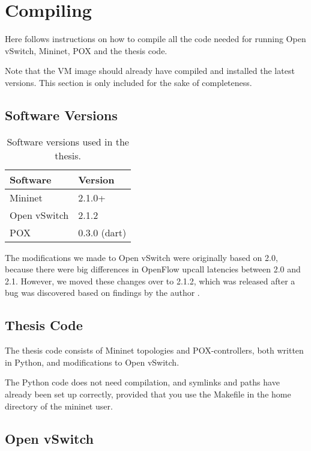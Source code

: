 \section{Compiling}
\label{chapter:compiling}

Here follows instructions on how to compile all the code needed for running
Open vSwitch, Mininet, POX and the thesis code.

Note that the VM image should already have compiled and installed the latest
versions.  This section is only included for the sake of completeness.

\subsection{Software Versions}
\label{chapter:software.versions}

\begin{table}[H]
  \centering
  \begin{tabular}{ll}
  \hline
    \textbf{Software} & \textbf{Version} \\
  \hline
    Mininet & 2.1.0+ \\
    Open vSwitch & 2.1.2 \\
    POX & 0.3.0 (dart) \\
  \hline
  \end{tabular}
  \caption{Software versions used in the thesis.}
  \label{table:software.versions}
\end{table}

The modifications we made to Open vSwitch were
originally based on 2.0, because there were big differences in OpenFlow
upcall latencies between 2.0 and 2.1.  However, we moved these changes over
to 2.1.2, which was released after a bug was discovered based on findings by
the author \cite{ovs.bug}.

\subsection{Thesis Code}

The thesis code consists of Mininet topologies and POX-controllers, both
written in Python, and modifications to Open vSwitch.

The Python code does not need compilation, and symlinks and paths have
already been set up correctly, provided that you use the Makefile in the
home directory of the mininet user.

\subsection{Open vSwitch}
\label{chapter:compiling.ovs}

